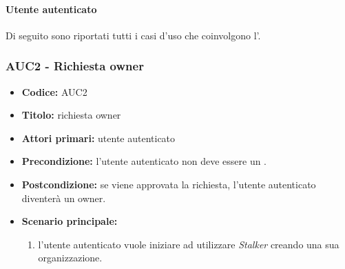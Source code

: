 \documentclass[casi-duso]{subfiles}
\begin{document}
\paragraph{Utente autenticato}%
\label{par:utente-autenticato}
Di seguito sono riportati tutti i casi d'uso che coinvolgono l'.

\subsubsection{AUC2 - Richiesta owner}%
\label{subsub:AUC2}
\begin{itemize}
  \item \textbf{Codice:} AUC2
  \item \textbf{Titolo:} richiesta owner
  \item \textbf{Attori primari:} utente autenticato
  \item \textbf{Precondizione:} l'utente autenticato non deve essere un .
  \item \textbf{Postcondizione:} se viene approvata la richiesta, l'utente autenticato diventerà un owner.
  \item \textbf{Scenario principale:}
  \begin{enumerate}
    \item l'utente autenticato vuole iniziare ad utilizzare \emph{Stalker} creando una sua organizzazione.
  \end{enumerate}
\end{itemize}
\end{document}
